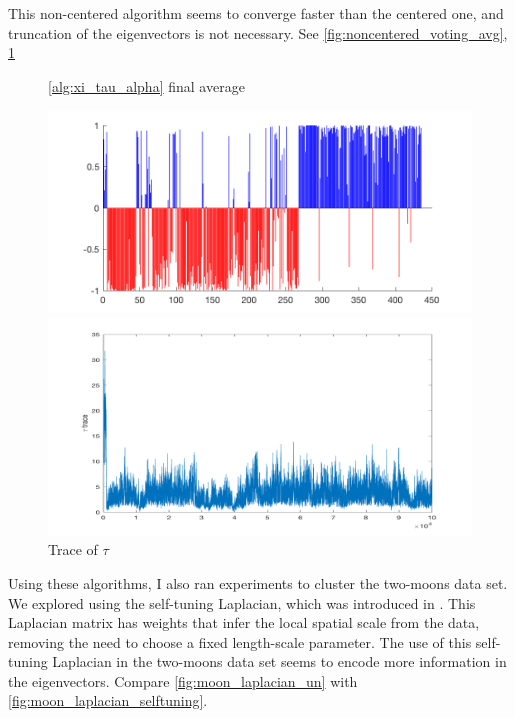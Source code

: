 \documentclass{siamart1116}
\begin{document}
This non-centered algorithm seems to converge faster than the centered one, and truncation of the eigenvectors is not necessary. See \cref{fig:noncentered_voting_avg}, \cref{fig:noncentered_voting_tau}

\begin{figure}[H]
\begin{minipage}{0.48\textwidth}
    \caption{\label{fig:noncentered_voting_avg}\cref{alg:xi_tau_alpha} final average}
    \includegraphics[width=\linewidth]{noncentered/final_avg.png}
\end{minipage}\hfill
\begin{minipage}{0.48\textwidth}
    \caption{\label{fig:noncentered_voting_tau} Trace of $\tau$}
    \includegraphics[width=\linewidth]{noncentered/trace_tau.png}
\end{minipage}
\end{figure}

Using these algorithms, I also ran experiments to cluster the two-moons data set. We explored using the self-tuning Laplacian, which was introduced in \cite{SelfTuning}. This Laplacian matrix has weights that infer the local spatial scale from the data, removing the need to choose a fixed length-scale parameter. The use of this self-tuning Laplacian in the two-moons data set seems to encode more information in the eigenvectors. Compare \cref{fig:moon_laplacian_un} with \cref{fig:moon_laplacian_selftuning}. 
\end{document}
